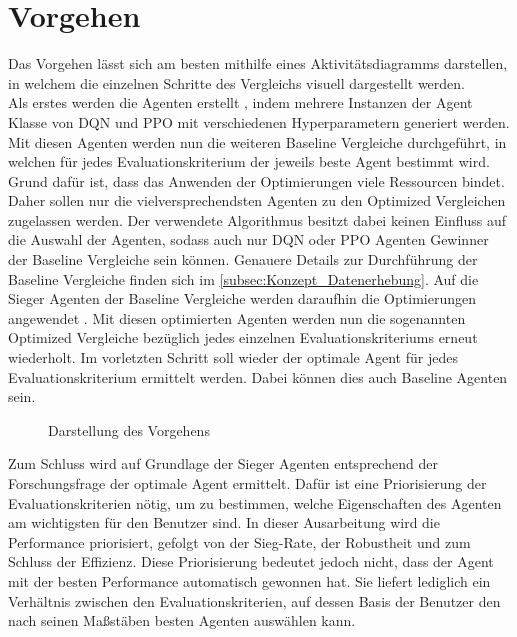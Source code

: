 \section{Vorgehen} \label{sec:Konzept_Vorgehen}
Das Vorgehen lässt sich am besten mithilfe eines Aktivitätsdiagramms darstellen, in welchem die einzelnen Schritte des Vergleichs visuell dargestellt werden.\\
Als erstes werden die Agenten erstellt , indem mehrere Instanzen der Agent Klasse von DQN und PPO mit verschiedenen Hyperparametern generiert werden.\\
Mit diesen Agenten werden nun die weiteren Baseline Vergleiche durchgeführt, in welchen für jedes Evaluationskriterium der jeweils beste Agent bestimmt wird. Grund dafür ist, dass das Anwenden der Optimierungen viele Ressourcen bindet. Daher sollen nur die vielversprechendsten Agenten zu den Optimized Vergleichen zugelassen werden.
Der verwendete Algorithmus besitzt dabei keinen Einfluss auf die Auswahl der Agenten, sodass auch nur DQN oder PPO Agenten Gewinner der Baseline Vergleiche sein können. Genauere Details zur Durchführung der Baseline Vergleiche finden sich im \autoref{subsec:Konzept_Datenerhebung}.
Auf die Sieger Agenten der Baseline Vergleiche werden daraufhin die Optimierungen angewendet . 
Mit diesen optimierten Agenten werden nun die sogenannten Optimized Vergleiche bezüglich jedes einzelnen Evaluationskriteriums  erneut wiederholt. Im vorletzten Schritt soll wieder der optimale Agent für jedes Evaluationskriterium ermittelt werden. Dabei können dies auch Baseline Agenten sein.
\begin{figure}[H]
	\centering
	
	\caption[Aktivitätsdiagramm des Vorgehens]{Darstellung des Vorgehens}
	\label{fig:Konzept_Vorgehen}
\end{figure}
Zum Schluss wird auf Grundlage der Sieger Agenten entsprechend der Forschungsfrage der optimale Agent ermittelt. Dafür ist eine Priorisierung der Evaluationskriterien nötig, um zu bestimmen, welche Eigenschaften des Agenten am wichtigsten für den Benutzer sind. In dieser Ausarbeitung wird die Performance priorisiert, gefolgt von der Sieg-Rate, der Robustheit und zum Schluss der Effizienz. Diese Priorisierung bedeutet jedoch nicht, dass der Agent mit der besten Performance automatisch gewonnen hat. Sie liefert lediglich ein Verhältnis zwischen den Evaluationskriterien, auf dessen Basis der Benutzer den nach seinen Maßstäben besten Agenten auswählen kann.


